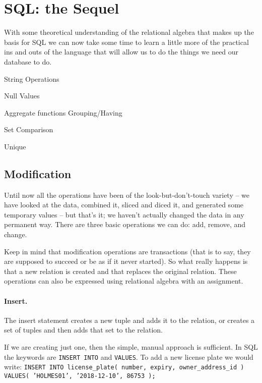 




\section*{SQL: the Sequel}
With some theoretical understanding of the relational algebra that makes up the basis for SQL we can now take some time to learn a little more of the practical ins and outs of the language that will allow us to do the things we need our database to do. 

String Operations

Null Values

Aggregate functions
	Grouping/Having
	
Set Comparison

Unique

\subsection*{Modification}

Until now all the operations have been of the look-but-don't-touch variety -- we have looked at the data, combined it, sliced and diced it, and generated some temporary values -- but that's it; we haven't actually changed the data in any permanent way. There are three basic operations we can do: add, remove, and change.

Keep in mind that modification operations are transactions (that is to say, they are supposed to succeed or be as if it never started). So what really happens is that a new relation is created and that replaces the original relation. These operations can also be expressed using relational algebra with an assignment. 



\paragraph{Insert.}

The insert statement creates a new tuple and adds it to the relation, or creates a set of tuples and then adds that set to the relation.

If we are creating just one, then the simple, manual approach is sufficient. In SQL the keywords are \texttt{INSERT INTO} and \texttt{VALUES}. To add a new license plate we would write: \texttt{INSERT INTO license\_plate( number, expiry, owner\_address\_id ) VALUES( 'HOLMES01', '2018-12-10', 86753 );} 

